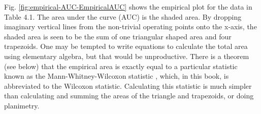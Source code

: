 \documentclass[
]{book}
\newenvironment{Shaded}{\begin{snugshade}}{\end{snugshade}}
\newcommand{\CommentTok}[1]{\textcolor[rgb]{0.56,0.35,0.01}{\textit{#1}}}
\newcommand{\DataTypeTok}[1]{\textcolor[rgb]{0.13,0.29,0.53}{#1}}
\newcommand{\DecValTok}[1]{\textcolor[rgb]{0.00,0.00,0.81}{#1}}
\newcommand{\KeywordTok}[1]{\textcolor[rgb]{0.13,0.29,0.53}{\textbf{#1}}}
\newcommand{\NormalTok}[1]{#1}
\newcommand{\OperatorTok}[1]{\textcolor[rgb]{0.81,0.36,0.00}{\textbf{#1}}}
\newcommand{\StringTok}[1]{\textcolor[rgb]{0.31,0.60,0.02}{#1}}
\begin{document}
Fig. \ref{fig:empirical-AUC-EmpiricalAUC} shows the empirical plot for the data in Table 4.1. The area under the curve (AUC) is the shaded area. By dropping imaginary vertical lines from the non-trivial operating points onto the x-axis, the shaded area is seen to be the sum of one triangular shaped area and four trapezoids. One may be tempted to write equations to calculate the total area using elementary algebra, but that would be unproductive. There is a theorem (see below) that the empirical area is exactly equal to a particular statistic known as the Mann-Whitney-Wilcoxon statistic \citep{RN2191, RN2197}, which, in this book, is abbreviated to the Wilcoxon statistic. Calculating this statistic is much simpler than calculating and summing the areas of the triangle and trapezoids, or doing planimetry.

\begin{Shaded}
\end{Shaded}
\end{document}
